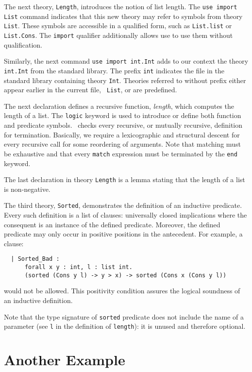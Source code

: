 The next theory, \texttt{Length}, introduces the notion of list
length. The \texttt{use import List} command indicates that this new
theory may refer to symbols from theory \texttt{List}. These symbols
are accessible in a qualified form, such as \texttt{List.list} or
\texttt{List.Cons}. The \texttt{import} qualifier additionally allows
use to use them without qualification.

Similarly, the next command \texttt{use import int.Int} adds to our
context the theory \texttt{int.Int} from the standard library. The
prefix \texttt{int} indicates the file in the standard library
containing theory \texttt{Int}. Theories referred to without prefix
either appear earlier in the current file, \eg\ \texttt{List}, or are
predefined. 

The next declaration defines a recursive function, \emph{length},
which computes the length of a list. The \texttt{logic} keyword is
used to introduce or define both function and predicate symbols. 
\why\ checks every recursive, or mutually recursive, definition for
termination. Basically, we require a lexicographic and structural
descent for every recursive call for some reordering of arguments. 
Note that matching must be exhaustive and that every \texttt{match}
expression must be terminated by the \texttt{end} keyword.

The last declaration in theory \texttt{Length} is a lemma stating that
the length of a list is non-negative. 

The third theory, \texttt{Sorted}, demonstrates the definition of
an inductive predicate. Every such definition is a list of clauses:
universally closed implications where the consequent is an instance
of the defined predicate. Moreover, the defined predicate may only
occur in positive positions in the antecedent. For example, a clause:
\begin{verbatim}
  | Sorted_Bad :
      forall x y : int, l : list int.
      (sorted (Cons y l) -> y > x) -> sorted (Cons x (Cons y l))
\end{verbatim}
would not be allowed. This positivity condition assures the logical
soundness of an inductive definition.

Note that the type signature of \texttt{sorted} predicate does not
include the name of a parameter (see \texttt{l} in the definition
of \texttt{length}): it is unused and therefore optional.

\section*{Another Example}

